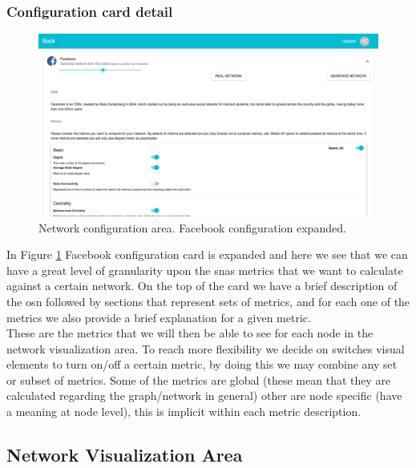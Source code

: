 \subsubsection*{Configuration card detail}

\begin{figure}[h!]
\begin{center}
  \hspace*{-0.8in}
  \includegraphics[width=1.2\textwidth]{img/socii/socii_2.png}
\end{center}
\caption{\label{img:socii_2} Network configuration area. Facebook configuration expanded.}
\end{figure}

In Figure \ref{img:socii_2} Facebook configuration card is expanded and here we see that we can have a great level of granularity upon the \glspl{sna} metrics that we want to calculate against a certain network. On the top of the card we have a brief description of the \gls{osn} followed by sections that represent sets of metrics, and for each one of the metrics we also provide a brief explanation for a given metric.\\
\indent These are the metrics that we will then be able to see for each node in the network visualization area. To reach more flexibility we decide on switches visual elements to turn on/off a certain metric, by doing this we may combine any set or subset of metrics. Some of the metrics are global (these mean that they are calculated regarding the graph/network in general) other are node specific (have a meaning at node level), this is implicit within each metric description.

\subsection{Network Visualization Area}

